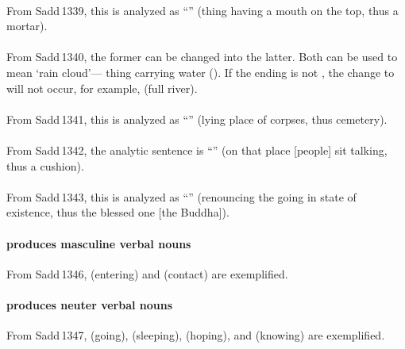 \paragraph*{} From Sadd\,1339, this is analyzed as ``'' (thing having a mouth on the top, thus a mortar).

\paragraph*{} From Sadd\,1340, the former can be changed into the latter. Both can be used to mean `rain cloud'--- thing carrying water (). If the ending is not , the change to  will not occur, for example,  (full river).

\paragraph*{} From Sadd\,1341, this is analyzed as ``'' (lying place of corpses, thus cemetery).

\paragraph*{} From Sadd\,1342, the analytic sentence is ``'' (on that place [people] sit talking, thus a cushion).

\paragraph*{} From Sadd\,1343, this is analyzed as ``'' (renouncing the going in state of existence, thus the blessed one [the Buddha]).

\paragraph*{ produces masculine verbal nouns} From Sadd\,1346,  (entering) and  (contact) are exemplified.

\paragraph*{ produces neuter verbal nouns} From Sadd\,1347,  (going),  (sleeping),  (hoping), and  (knowing) are exemplified.
